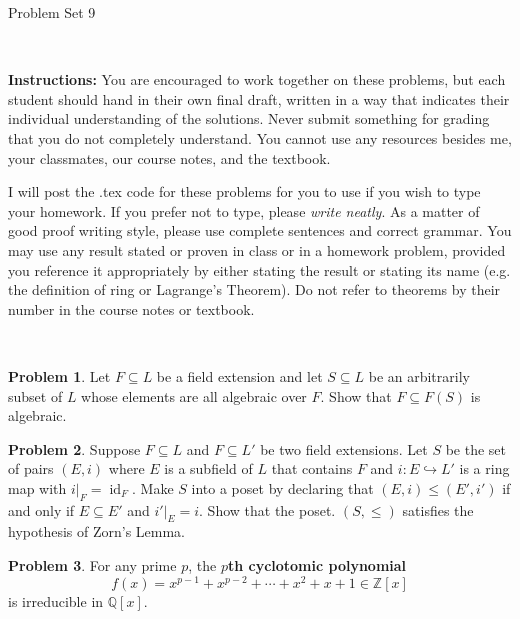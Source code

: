 \documentclass[11pt]{article}
\title{}
\date{\vspace{-0.5in}}
\DeclareMathOperator{\id}{id}
\newcommand{\C}{\mathbb{C}}
\newcommand{\Q}{\mathbb{Q}}
\newcommand{\Z}{\mathbb{Z}}
\newcommand{\R}{\mathbb{R}}
\theoremstyle{definition}
\newtheorem{problem}{Problem}
\begin{document}
\thispagestyle{fancy}
\pagestyle{fancy}

\vspace{3em}

\begin{center}
	{\LARGE Problem Set 9}
\end{center}

\

\noindent
{\bf Instructions:}
You are encouraged to work together on these problems, but each student should hand in their own final draft, written in a way that indicates their individual understanding of the solutions. Never submit something for grading that you do not completely understand. You cannot use any resources besides me, your classmates, our course notes, and the textbook.


I will post the .tex code for these problems for you to use if you wish to type your homework. If you prefer not to type, please  {\em write neatly}. As a matter of good proof writing style, please use complete sentences and correct grammar. You may use any result  stated or proven in class or in a homework problem, provided you reference it appropriately by either stating the result or stating its name (e.g. the definition of ring or Lagrange's Theorem). Do not refer to theorems by their number in the course notes or textbook.


\



\begin{problem}
	Let $F \subseteq L$ be a field extension and let $S \subseteq L$ be an arbitrarily subset of $L$ whose elements are all algebraic over $F$. Show that $F \subseteq F(S)$ is algebraic.
\end{problem}



\begin{problem}
Suppose $F \subseteq L$ and $F \subseteq L'$ be two field extensions. Let $S$ be the set of pairs $(E,i)$ where $E$ is a subfield of $L$ that contains $F$ and $i: E \hookrightarrow L'$ is a ring map with $i|_F = \id_F$. Make $S$ into a poset by declaring that $(E,i) \leq (E',i')$ if and only if $E \subseteq E'$ and $i'|_E = i$. Show that the poset. $(S, \leq)$ satisfies the hypothesis of Zorn's Lemma.
\end{problem}



\begin{problem} 
For any prime $p$, the {\bf $p$th cyclotomic polynomial}
$$f(x) = x^{p-1} + x^{p-2} + \cdots + x^2 + x + 1 \in \Z[x]$$
is irreducible in $\Q[x]$.
\end{problem}


%
%
%
%
\end{document}
